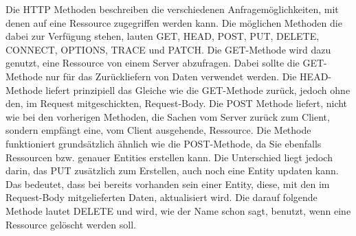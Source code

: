 Die HTTP Methoden beschreiben die verschiedenen Anfragemöglichkeiten, mit denen auf eine Ressource zugegriffen werden kann. Die möglichen Methoden die dabei zur Verfügung stehen, lauten GET, HEAD, POST, PUT, DELETE, CONNECT, OPTIONS, TRACE und PATCH. \newline
Die GET-Methode wird dazu genutzt, eine Ressource von einem Server abzufragen. Dabei sollte die GET-Methode nur für das Zurückliefern von Daten verwendet werden. \newline
Die HEAD-Methode liefert prinzipiell das Gleiche wie die GET-Methode zurück, jedoch ohne den, im Request mitgeschickten, Request-Body. \newline
Die POST Methode liefert, nicht wie bei den vorherigen Methoden, die Sachen vom Server zurück zum Client, sondern empfängt eine, vom Client ausgehende, Ressource. \newline
Die Methode funktioniert grundsätzlich ähnlich wie die POST-Methode, da Sie ebenfalls Ressourcen bzw. genauer Entities erstellen kann. Die Unterschied liegt jedoch darin, das PUT zusätzlich zum Erstellen, auch noch eine Entity updaten kann. Das bedeutet, dass bei bereits vorhanden sein einer Entity, diese, mit den im Request-Body mitgelieferten Daten, aktualisiert wird. \newline
Die darauf folgende Methode lautet DELETE und wird, wie der Name schon sagt, benutzt, wenn eine Ressource gelöscht werden soll.
